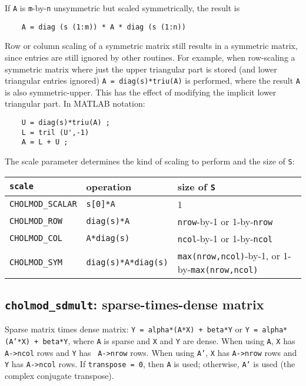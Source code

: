 \documentclass[11pt]{article}
\begin{document}
If {\tt A} is {\tt m}-by-{\tt n} unsymmetric but scaled symmetrically, the
result is

\begin{verbatim}
    A = diag (s (1:m)) * A * diag (s (1:n))
\end{verbatim}

Row or column scaling of a symmetric matrix still results in a symmetric
matrix, since entries are still ignored by other routines.  For example, when
row-scaling a symmetric matrix where just the upper triangular part is stored
(and lower triangular entries ignored) {\tt A = diag(s)*triu(A)} is performed,
where the result {\tt A} is also symmetric-upper.  This has the effect of
modifying the implicit lower triangular part.  In MATLAB notation:

\begin{verbatim}
    U = diag(s)*triu(A) ;
    L = tril (U',-1)
    A = L + U ;
\end{verbatim}

The scale parameter determines the kind of scaling to perform and the size of
{\tt S}:

\begin{tabular}{lll}
\hline
{\tt scale} & operation & size of {\tt S} \\
\hline
{\tt CHOLMOD\_SCALAR} & {\tt s[0]*A}            & 1 \\
{\tt CHOLMOD\_ROW}    & {\tt diag(s)*A}         & {\tt nrow}-by-1 or 1-by-{\tt nrow} \\
{\tt CHOLMOD\_COL}    & {\tt A*diag(s)}         & {\tt ncol}-by-1 or 1-by-{\tt ncol} \\
{\tt CHOLMOD\_SYM}    & {\tt diag(s)*A*diag(s)} & {\tt max(nrow,ncol)}-by-1, or 1-by-{\tt max(nrow,ncol)} \\
\hline
\end{tabular}

\subsection{{\tt cholmod\_sdmult}: sparse-times-dense matrix}


Sparse matrix times dense matrix: {\tt Y = alpha*(A*X) + beta*Y} or {\tt Y =
alpha*(A'*X) + beta*Y}, where {\tt A} is sparse and {\tt X} and {\tt Y} are
dense.  When using {\tt A}, {\tt X} has {\tt A->ncol} rows and {\tt Y} has {\tt
A->nrow} rows.  When using {\tt A'}, {\tt X} has {\tt A->nrow} rows and {\tt Y}
has {\tt A->ncol} rows.  If {\tt transpose = 0}, then {\tt A} is used;
otherwise, {\tt A'} is used (the complex conjugate transpose).
\end{document}
